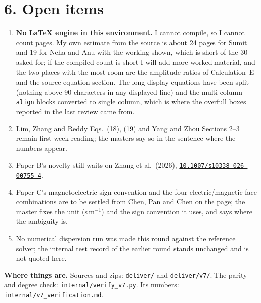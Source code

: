 \documentclass[11pt]{article}
\newcommand{\doi}[1]{\href{https://doi.org/#1}{\texttt{#1}}}
\begin{document}
\section*{6. Open items}

\begin{enumerate}\setlength{\itemsep}{2pt}
\item \textbf{No LaTeX engine in this environment.} I cannot compile, so I cannot count pages. My own
estimate from the source is about 24 pages for Sumit and 19 for Neha and Anu with the working shown, which
is short of the 30 asked for; if the compiled count is short I will add more worked material, and the two
places with the most room are the amplitude ratios of Calculation~E and the source-equation section. The
long display equations have been split (nothing above 90 characters in any displayed line) and the
multi-column \texttt{align} blocks converted to single column, which is where the overfull boxes reported
in the last review came from.
\item Lim, Zhang and Reddy Eqs.~(18), (19) and Yang and Zhou Sections 2--3 remain first-week reading; the
masters say so in the sentence where the numbers appear.
\item Paper B's novelty still waits on Zhang et al.\ (2026), \doi{10.1007/s10338-026-00755-4}.
\item Paper C's magnetoelectric sign convention and the four electric/magnetic face combinations are to be
settled from Chen, Pan and Chen on the page; the master fixes the unit (s\,m$^{-1}$) and the sign
convention it uses, and says where the ambiguity is.
\item No numerical dispersion run was made this round against the reference solver; the internal test
record of the earlier round stands unchanged and is not quoted here.
\end{enumerate}

\noindent\textbf{Where things are.} Sources and zips: \texttt{deliver/} and \texttt{deliver/v7/}. The parity
and degree check: \texttt{internal/verify\_v7.py}. Its numbers: \texttt{internal/v7\_verification.md}.
\end{document}
